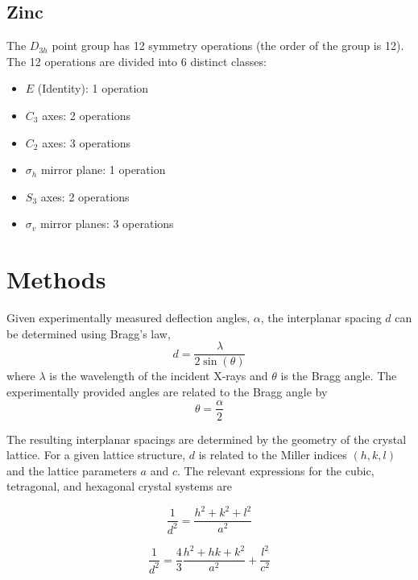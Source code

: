 \documentclass[12pt]{article}
\begin{document}
\subsection{Zinc}

The $D_{3h}$ point group has 12 symmetry operations (the order of the group is 12). The 12 operations are divided into 6 distinct classes:
\begin{itemize}
    \item $E$ (Identity): 1 operation
    \item $C_{3}$ axes: 2 operations
    \item $C_{2}$ axes: 3 operations
    \item $\sigma_{h}$ mirror plane: 1 operation
    \item $S_{3}$ axes: 2 operations
    \item $\sigma_{v}$ mirror planes: 3 operations
\end{itemize}




\section{Methods}
Given experimentally measured deflection angles, $\alpha$, the interplanar spacing $d$ can be determined using Bragg's law,
\begin{equation}
    d = \frac{\lambda}{2\sin(\theta)}
\end{equation}
where $\lambda$ is the wavelength of the incident X-rays and $\theta$ is the Bragg angle. The experimentally provided angles are related to the Bragg angle by 
\begin{equation}
     \theta = \frac{\alpha}{2}
 \end{equation}

The resulting interplanar spacings are determined by the geometry of the crystal lattice. For a given lattice structure, $d$ is related to the Miller indices $(h,k,l)$ and the lattice parameters $a$ and $c$. The relevant expressions for the cubic, tetragonal, and hexagonal crystal systems are

\begin{equation}
  \tag{Cubic}
  \label{eq:Cubic}
    \frac{1}{d^2} = \frac{h^2+k^2+l^2}{a^2}
\end{equation}

\begin{equation}
    \tag{Hexagonal}
    \label{eq:Hexagonal}
    \frac{1}{d^2} = \frac{4}{3}\frac{h^2+hk+k^2}{a^2}+\frac{l^2}{c^2}
\end{equation}
\end{document}
